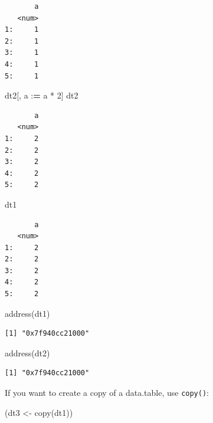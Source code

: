 \documentclass[
]{book}
\newenvironment{Shaded}{\begin{snugshade}}{\end{snugshade}}
\newcommand{\DecValTok}[1]{\textcolor[rgb]{0.00,0.00,0.81}{#1}}
\newcommand{\ErrorTok}[1]{\textcolor[rgb]{0.64,0.00,0.00}{\textbf{#1}}}
\newcommand{\FunctionTok}[1]{\textcolor[rgb]{0.00,0.00,0.00}{#1}}
\newcommand{\NormalTok}[1]{#1}
\newcommand{\OtherTok}[1]{\textcolor[rgb]{0.56,0.35,0.01}{#1}}
\newcommand{\SpecialCharTok}[1]{\textcolor[rgb]{0.00,0.00,0.00}{#1}}
\begin{document}
\begin{verbatim}
       a
   <num>
1:     1
2:     1
3:     1
4:     1
5:     1
\end{verbatim}

\begin{Shaded}
\begin{Highlighting}[]
\NormalTok{dt2[, a }\SpecialCharTok{:}\ErrorTok{=}\NormalTok{ a }\SpecialCharTok{*} \DecValTok{2}\NormalTok{]}
\NormalTok{dt2}
\end{Highlighting}
\end{Shaded}

\begin{verbatim}
       a
   <num>
1:     2
2:     2
3:     2
4:     2
5:     2
\end{verbatim}

\begin{Shaded}
\begin{Highlighting}[]
\NormalTok{dt1}
\end{Highlighting}
\end{Shaded}

\begin{verbatim}
       a
   <num>
1:     2
2:     2
3:     2
4:     2
5:     2
\end{verbatim}

\begin{Shaded}
\begin{Highlighting}[]
\FunctionTok{address}\NormalTok{(dt1)}
\end{Highlighting}
\end{Shaded}

\begin{verbatim}
[1] "0x7f940cc21000"
\end{verbatim}

\begin{Shaded}
\begin{Highlighting}[]
\FunctionTok{address}\NormalTok{(dt2)}
\end{Highlighting}
\end{Shaded}

\begin{verbatim}
[1] "0x7f940cc21000"
\end{verbatim}

\begin{rmdnote}
If you want to create a copy of a data.table, use \texttt{copy()}:
\end{rmdnote}

\begin{Shaded}
\begin{Highlighting}[]
\NormalTok{(dt3 }\OtherTok{\textless{}{-}} \FunctionTok{copy}\NormalTok{(dt1))}
\end{Highlighting}
\end{Shaded}
\end{document}
